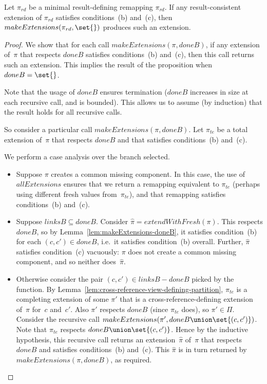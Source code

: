 \begin{prop}
\label{prop:makeExtensions}
Let $\pi_{rd}$ be a minimal result-defining remapping $\pi_{rd}$.  If any
result-consistent extension of $\pi_{rd}$ satisfies conditions~(b) and~(c),
then $makeExtensions(\pi_{rd}, \set{})$ produces such an extension.
\end{prop}
%
\begin{proof}
We show that for each call $makeExtensions(\pi,doneB)$, if any extension
of~$\pi$ that respects $doneB$ satisfies conditions~(b) and~(c), then this
call returns such an extension.  This implies the result of the proposition
when $doneB = \set{}$. 

Note that the usage of $doneB$ ensures termination ($doneB$ increases in size
at each recursive call, and is bounded).  This allows us to assume (by
induction) that the result holds for all recursive calls.

So consider a particular call $makeExtensions(\pi,doneB)$.  Let $\pi_{te}$ be
a total extension of~$\pi$ that respects $doneB$ and that satisfies
conditions~(b) and~(c).  


We perform a case analysis over the branch selected.
%
\begin{itemize}
\item Suppose $\pi$ creates a common missing component.  In this case, the use
of $allExtensions$ ensures that we return a remapping equivalent to $\pi_{te}$
(perhaps using different fresh values from~$\pi_{te}$), and that remapping
satisfies conditions~(b) and~(c). 

\item Suppose $linksB \subseteq doneB$.  Consider $\hat\pi =
  extendWithFresh(\pi)$.  This respects $doneB$, so by
  Lemma~\ref{lem:makeExtensions-doneB}, it satisfies condition~(b) for each
  $(c,c') \in doneB$, i.e.~it satisfies condition~(b) overall.
%
Further, $\hat\pi$ satisfies condition~(c) vacuously: $\pi$ does not create a
common missing component, and so neither does~$\hat\pi$.

\item Otherwise consider the pair $(c,c') \in linksB - doneB$ picked by the
function.  By Lemma~\ref{lem:cross-reference-view-defining-partition},
$\pi_{te}$ is a completing extension of some $\pi'$ that is a
cross-reference-defining extension of~$\pi$ for~$c$ and~$c'$.  Also $\pi'$
respects $doneB$ (since $\pi_{te}$ does), so $\pi' \in \Pi$.  Consider the
recursive call $makeExtensions(\pi', doneB \union \set{(c,c')})$.  Note that
$\pi_{te}$ respects $doneB \union \set{(c,c')}$.  Hence by the inductive
hypothesis, this recursive call returns an extension~$\hat\pi$ of~$\pi$ that
respects $doneB$ and satisfies conditions~(b) and~(c).  This $\hat\pi$ is in
turn returned by $makeExtensions(\pi,doneB)$, as required.
\end{itemize}
\end{proof}

